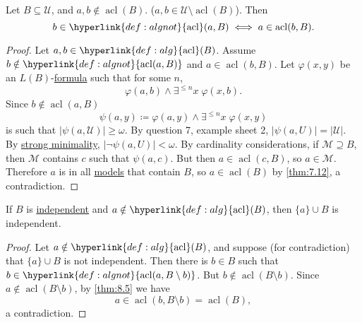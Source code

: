 \documentclass{article}
\DeclareMathOperator{\acl}{acl}
\newcommand{\named}[1]{\textbf{#1}\index{#1}}
\begin{document}
\begin{nthm}\label{thm:8.5}
  Let $B \subseteq \mathcal{U}$, and $a,b \notin \acl(B)$. ($a,b \in \mathcal{U} \setminus \acl(B)$).
  Then
  \begin{equation*}
    b \in \hyperlink{def:algnot}{\acl}(a,B) \iff a \in \acl(b,B).
  \end{equation*}
\end{nthm}
\begin{proof}
  Let $a,b \in \hyperlink{def:alg}{\acl}(B)$. Assume $b \notin \hyperlink{def:algnot}{\acl(a,B)}$ and $a \in \acl(b,B)$.
  Let $\varphi(x,y)$ be an $L(B)$-\hyperlink{def:form}{formula} such that for some $n$,
  \begin{equation*}
    \varphi(a,b) \land \exists^{\leq n} x \; \varphi(x,b).
  \end{equation*}
  Since $b \notin \acl(a,B)$
  \begin{equation*}
    \psi(a,y) \coloneqq \varphi(a,y) \land \exists^{\leq n} x \; \varphi(x,y)
  \end{equation*}
  is such that $|\psi(a,\mathcal{U})| \geq \omega$.
  By question 7, example sheet 2, $|\psi(a,U)| = |\mathcal{U}|$.
  By \hyperlink{def:minimal}{strong minimality}, $|\neg \psi(a,U)| < \omega$.
  By cardinality considerations, if $\mathcal{M} \supseteq B$, then $\mathcal{M}$ contains $c$ such that $\psi(a,c)$.
  But then $a \in \acl(c,B)$, so $a \in \mathcal{M}$.
  Therefore $a$ is in all \hyperlink{def:model}{models} that contain $B$, so $a \in \acl(B)$ by \cref{thm:7.12}, a contradiction.
\end{proof}
\begin{nlemma}\label{lem:8.7}
  If $B$ is \hyperlink{def:indep}{independent} and $a \notin \hyperlink{def:alg}{\acl}(B)$, then $\{a\} \cup B$ is independent.
\end{nlemma}
\begin{proof}
  Let $a \notin \hyperlink{def:alg}{\acl}(B)$, and suppose (for contradiction) that $\{a\} \cup B$ is not independent.
  Then there is $b \in B$ such that $b \in \hyperlink{def:algnot}{\acl(a, B\setminus b)}$.
  But $b \notin \acl(B \setminus b)$. Since $a \notin \acl(B \setminus b)$, by \cref{thm:8.5} we have
  \begin{equation*}
    a \in \acl(b, B \setminus b) = \acl(B),
  \end{equation*}
  a contradiction.
\end{proof}
\end{document}
